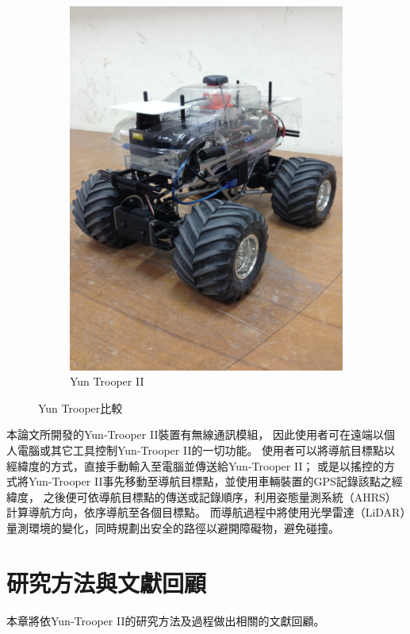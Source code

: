 \begin{figure}[h!]
\begin{subfigure}[b]{0.45\textwidth}
		\includegraphics[width=\textwidth]{figures/YunTrooperII}
		\caption{Yun Trooper II}
		\label{f:YunTrooperII}
	\end{subfigure}
	\caption{Yun Trooper比較}
\end{figure}

本論文所開發的Yun-Trooper II裝置有無線通訊模組，
因此使用者可在遠端以個人電腦或其它工具控制Yun-Trooper II的一切功能。
使用者可以將導航目標點以經緯度的方式，直接手動輸入至電腦並傳送給Yun-Trooper II；
或是以搖控的方式將Yun-Trooper II事先移動至導航目標點，並使用車輛裝置的GPS記錄該點之經緯度，
之後便可依導航目標點的傳送或記錄順序，利用姿態量測系統（AHRS）計算導航方向，依序導航至各個目標點。
而導航過程中將使用光學雷達（LiDAR）量測環境的變化，同時規劃出安全的路徑以避開障礙物，避免碰撞。

\section{研究方法與文獻回顧}
本章將依Yun-Trooper II的研究方法及過程做出相關的文獻回顧。

